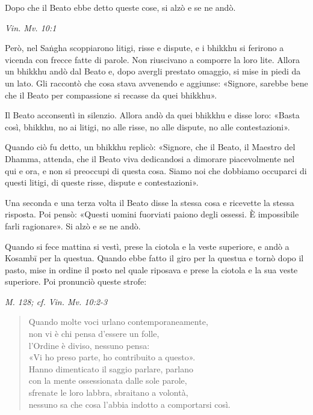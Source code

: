 Dopo che il Beato ebbe detto queste cose, si alzò e se ne andò.


\emph{Vin. Mv. 10:1}


 Però, nel Saṅgha scoppiarono litigi, risse e dispute, e i
bhikkhu si ferirono a vicenda con frecce fatte di parole. Non riuscivano
a comporre la loro lite. Allora un bhikkhu andò dal Beato e, dopo
avergli prestato omaggio, si mise in piedi da un lato. Gli raccontò che
cosa stava avvenendo e aggiunse: «Signore, sarebbe bene che il Beato per
compassione si recasse da quei bhikkhu».


Il Beato acconsentì in silenzio. Allora andò da quei bhikkhu e disse
loro: «Basta così, bhikkhu, no ai litigi, no alle risse, no alle
dispute, no alle contestazioni».


Quando ciò fu detto, un bhikkhu replicò: «Signore, che il Beato, il
Maestro del Dhamma, attenda, che il Beato viva dedicandosi a dimorare
piacevolmente nel qui e ora, e non si preoccupi di questa cosa. Siamo
noi che dobbiamo occuparci di questi litigi, di queste risse, dispute e
contestazioni».


Una seconda e una terza volta il Beato disse la stessa cosa e ricevette
la stessa risposta. Poi pensò: «Questi uomini fuorviati paiono degli
ossessi. È impossibile farli ragionare». Si alzò e se ne andò.


Quando si fece mattina si vestì, prese la ciotola e la veste superiore,
e andò a Kosambī per la questua. Quando ebbe fatto il giro per la
questua e tornò dopo il pasto, mise in ordine il posto nel quale
riposava e prese la ciotola e la sua veste superiore. Poi pronunciò
queste strofe:


\emph{M. 128; cf. Vin. Mv. 10:2-3}


\begin{quote}
Quando molte voci urlano contemporaneamente, \\
non vi è chi pensa d’essere un folle, \\
l’Ordine è diviso, nessuno pensa: \\
«Vi ho preso parte, ho contribuito a questo». \\
Hanno dimenticato il saggio parlare, parlano \\
con la mente ossessionata dalle sole parole, \\
sfrenate le loro labbra, sbraitano a volontà, \\
nessuno sa che cosa l’abbia indotto a comportarsi così.
\end{quote}

